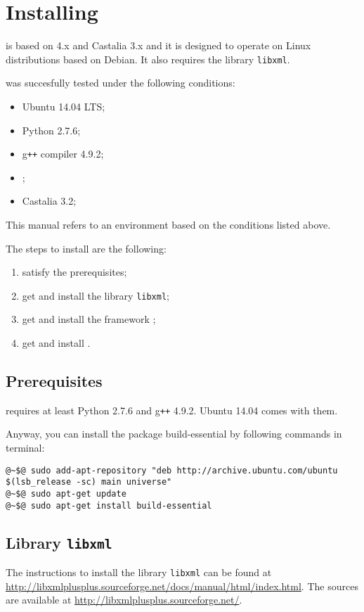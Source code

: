 
\section{Installing \asf}
\label{chap:installing-asfpp}
\asf is based on \omnet 4.x and Castalia 3.x and it is designed to operate on Linux distributions based on Debian. It also requires the library \texttt{libxml}. 

\asf was succesfully tested under the following conditions:
%
\begin{itemize}
\item Ubuntu 14.04 LTS;
\item Python 2.7.6;
\item g\texttt{++} compiler 4.9.2;
\item {};
\item Castalia 3.2;
\end{itemize}

This manual refers to an environment based on the conditions listed above.

The steps to install \asf are the following:
%
\begin{enumerate}
\item satisfy the prerequisites;
\item get and install the library \texttt{libxml};
\item get and install the framework \omnet;
\item get and install \asf. 
\end{enumerate}


\subsection{Prerequisites}
\asf requires at least Python 2.7.6 and g\texttt{++} 4.9.2. Ubuntu 14.04 comes with them.

Anyway, you can install the package build-essential by following commands in terminal:
%
\begin{lstlisting}[language={terminal}]
@~$@ sudo add-apt-repository "deb http://archive.ubuntu.com/ubuntu $(lsb_release -sc) main universe"
@~$@ sudo apt-get update
@~$@ sudo apt-get install build-essential
\end{lstlisting}


\subsection{Library \texttt{libxml}}
The instructions to install the library \texttt{libxml} can be found at \url{http://libxmlplusplus.sourceforge.net/docs/manual/html/index.html}. The sources are available at \url{http://libxmlplusplus.sourceforge.net/}.

